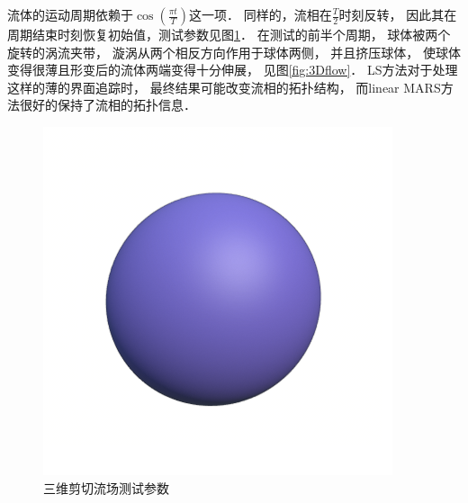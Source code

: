 流体的运动周期依赖于$\cos(\frac{\pi t}{T})$这一项．
同样的，流相在$\frac{T}{2}$时刻反转，
因此其在周期结束时刻恢复初始值，测试参数见图\ref{tab:de3}．
在测试的前半个周期，
球体被两个旋转的涡流夹带，
漩涡从两个相反方向作用于球体两侧，
并且挤压球体，
使球体变得很薄且形变后的流体两端变得十分伸展，
见图\ref{fig:3Dflow}．
LS方法对于处理这样的薄的界面追踪时，
最终结果可能改变流相的拓扑结构\cite{enright02:_hybrid_partic_level_set_method}，
而linear MARS方法很好的保持了流相的拓扑信息．
\begin{figure}[htbp]
	\begin{minipage}[b]{0.65\linewidth}
		\renewcommand{\arraystretch}{1.2}
		\centering
		
	\end{minipage}
	\hfill
	\begin{minipage}{0.3\linewidth}
		\centering
		\includegraphics[width=1\linewidth]{images/3}
	\end{minipage}
	\caption{三维剪切流场测试参数}
	\label{tab:de3}
\end{figure}

